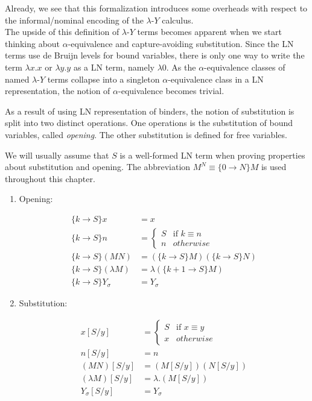 \documentclass[a4paper, 12pt, twoside]{style/ociamthesis}
\theoremstyle{plain}
\theoremstyle{definition}
\newtheorem{Definition}{Definition}[chapter]
\theoremstyle{remark}
\providecommand{\tightlist}{%
  \setlength{\itemsep}{0pt}\setlength{\parskip}{0pt}}
\newcommand{\lamy}{\lambda\text{-}Y}
\renewenvironment{Definition}{\begin{OldDefinition}\begin{mdframed}[style=example, linecolor=cyan]}{\end{mdframed}\end{OldDefinition}}
\begin{document}
Already, we see that this formalization introduces some overheads with
respect to the informal/nominal encoding of the \(\lamy\) calculus.\\
The upside of this definition of \(\lamy\) terms becomes apparent when
we start thinking about \(\alpha\)-equivalence and capture-avoiding
substitution. Since the LN terms use de Bruijn levels for bound
variables, there is only one way to write the term \(\lambda x.x\) or
\(\lambda y.y\) as a LN term, namely \(\lambda 0\). As the
\(\alpha\)-equivalence classes of named \(\lamy\) terms collapse into a
singleton \(\alpha\)-equivalence class in a LN representation, the
notion of \(\alpha\)-equivalence becomes trivial.

As a result of using LN representation of binders, the notion of
substitution is split into two distinct operations. One operations is
the substitution of bound variables, called \emph{opening}. The other
substitution is defined for free variables.

\begin{Definition}[Opening and substitution]

We will usually assume that \(S\) is a well-formed LN term when proving
properties about substitution and opening. The abbreviation
\(M^N \equiv \{0 \to N\}M\) is used throughout this chapter.

\begin{enumerate}
\def\labelenumi{\roman{enumi})}
\tightlist
\item
  Opening:

  \begin{align*}
  \{k \to S\}x &= x\\
  \{k \to S\}n &= \begin{cases}
  S & \text{if }k \equiv n\\
  n & otherwise
  \end{cases}\\
  \{k \to S\}(MN) &= (\{k \to S\}M)(\{k \to S\}N)\\
  \{k \to S\}(\lambda M) &= \lambda (\{k+1 \to S\}M)\\
  \{k \to S\}Y_\sigma &= Y_\sigma
  \end{align*}
\item
  Substitution:

  \begin{align*} 
  x[S/y] &= \begin{cases}
  S & \text{if }x \equiv y\\
  x & otherwise
  \end{cases}\\
  n[S/y] &= n \\
  (MN)[S/y] &= (M[S/y])(N[S/y])\\
  (\lambda M)[S/y] &= \lambda. (M[S/y])\\
  Y_\sigma[S/y] &= Y_\sigma
  \end{align*}
\end{enumerate}

\end{Definition}
\end{document}
